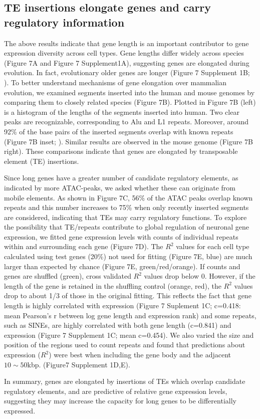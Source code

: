 \subsection{TE insertions elongate genes and carry regulatory information}

The above results indicate that gene length is an important contributor to gene expression diversity across cell types. Gene lengths differ widely across species (Figure 7A and Figure 7 Supplement1A), suggesting genes are elongated during evolution. In fact, evolutionary older genes are longer (Figure 7 Supplement 1B; \cite{Grishkevich_2014}). To better understand mechanisms of gene elongation over mammalian evolution, we examined segments inserted into the human and mouse genomes by comparing them to closely related species (Figure 7B). Plotted in Figure 7B (left) is a histogram of the lengths of the segments inserted into human. Two clear peaks are recognizable, corresponding to Alu and L1 repeats. Moreover, around 92\% of the base pairs of the inserted segments overlap with known repeats (Figure 7B inset; \cite{Bao_2015}). Similar results are observed in the mouse genome (Figure 7B right). These comparisons indicate that genes are elongated by transposable element (TE) insertions. 

Since long genes have a greater number of candidate regulatory elements, as indicated by more ATAC-peaks, we asked whether these can originate from mobile elements. As shown in Figure 7C, 56\% of the ATAC peaks overlap known repeats and this number increases to 75\% when only recently inserted segments are considered, indicating that TEs may carry regulatory functions. To explore the possibility that TE/repeats contribute to global regulation of neuronal gene expression, we fitted gene expression levels with counts of individual repeats within and surrounding each gene (Figure 7D).  The $R^2$ values for each cell type calculated using test genes (20\%) not used for fitting (Figure 7E, blue) are much larger than expected by chance (Figure 7E, green/red/orange). If counts and genes are shuffled (green), cross validated $R^2$ values drop below 0. However, if the length of the gene is retained in the shuffling control (orange, red), the $R^2$ values drop to about 1/3 of those in the original fitting. This reflects the fact that gene length is highly correlated with expression (Figure 7 Suplement 1C; c=0.418: mean Pearson's r between log gene length and expression rank) and some repeats, such as SINEs, are highly correlated with both gene length (c=0.841) and expression (Figure 7 Supplement 1C; mean c=0.454). We also varied the size and position of the regions used to count repeats and found that predictions about expression ($R^2$) were best when including the gene body and the adjacent $10\sim 50$kbp. (Figure7 Supplement 1D,E). 

In summary, genes are elongated by insertions of TEs which overlap candidate regulatory elements, and are predictive of relative gene expression levels, suggesting they may increase the capacity for long genes to be differentially expressed. 


